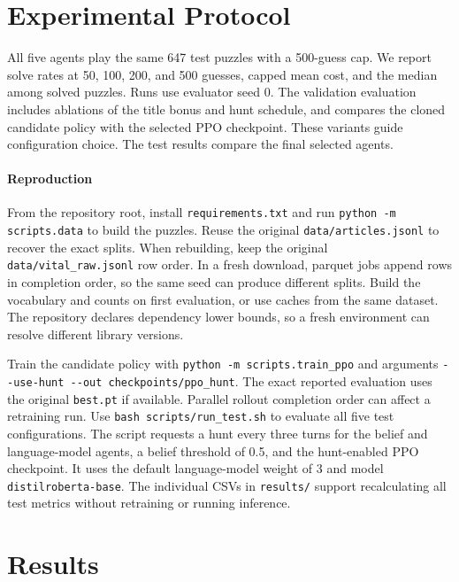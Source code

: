 \documentclass[conference]{IEEEtran}
\begin{document}
\section{Experimental Protocol}
All five agents play the same 647 test puzzles with a 500-guess cap. We report solve rates at 50, 100, 200, and 500 guesses, capped mean cost, and the median among solved puzzles. Runs use evaluator seed 0. The validation evaluation includes ablations of the title bonus and hunt schedule, and compares the cloned candidate policy with the selected PPO checkpoint. These variants guide configuration choice. The test results compare the final selected agents.

\paragraph{Reproduction}
From the repository root, install \texttt{requirements.txt} and run \verb|python -m scripts.data| to build the puzzles. Reuse the original \texttt{data/articles.jsonl} to recover the exact splits. When rebuilding, keep the original \texttt{data/vital\_raw.jsonl} row order. In a fresh download, parquet jobs append rows in completion order, so the same seed can produce different splits. Build the vocabulary and counts on first evaluation, or use caches from the same dataset. The repository declares dependency lower bounds, so a fresh environment can resolve different library versions.

Train the candidate policy with \verb|python -m scripts.train_ppo| and arguments \verb|--use-hunt --out checkpoints/ppo_hunt|. The exact reported evaluation uses the original \texttt{best.pt} if available. Parallel rollout completion order can affect a retraining run. Use \verb|bash scripts/run_test.sh| to evaluate all five test configurations. The script requests a hunt every three turns for the belief and language-model agents, a belief threshold of 0.5, and the hunt-enabled PPO checkpoint. It uses the default language-model weight of 3 and model \texttt{distilroberta-base}. The individual CSVs in \texttt{results/} support recalculating all test metrics without retraining or running inference.

\section{Results}
\end{document}
